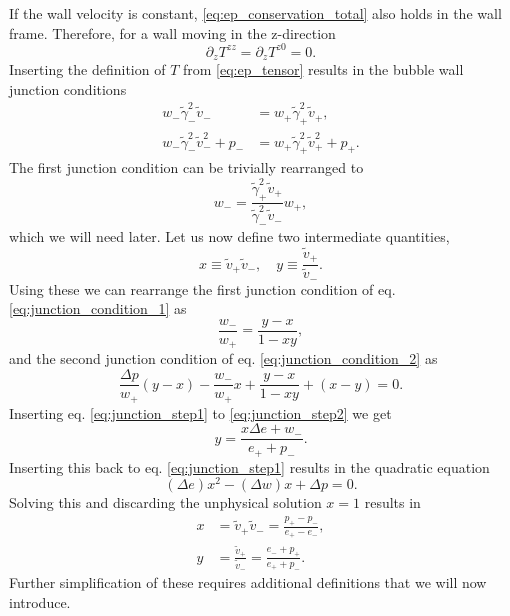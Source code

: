 If the wall velocity is constant, \eqref{eq:ep_conservation_total} also holds in the wall frame.
Therefore, for a wall moving in the z-direction
\cite[eq. 7]{espinosa_energy_2010}
\begin{equation}
\partial_z T^{zz} = \partial_z T^{z0} = 0.
\end{equation}
Inserting the definition of $T$ from \eqref{eq:ep_tensor} results in the
bubble wall junction conditions
\cites[eq. 7.22]{lecture_notes}[eq. 135.2, 135.3]{landau_fluid_1987}
\begin{align}
w_- \tilde{\gamma}_-^2 \tilde{v}_- &= w_+ \tilde{\gamma}_+^2 \tilde{v}_+,
\label{eq:junction_condition_1} \\
w_- \tilde{\gamma}_-^2 \tilde{v}_-^2 + p_- &= w_+ \tilde{\gamma}_+^2 \tilde{v}_+^2 + p_+.
\label{eq:junction_condition_2}
\end{align}
The first junction condition can be trivially rearranged to
\begin{equation}
w_- = \frac{\tilde{\gamma}_+^2 \tilde{v}_+}{\tilde{\gamma}_-^2 \tilde{v}_-} w_+,
\label{eq:wm_junction}
\end{equation}
which we will need later.
Let us now define two intermediate quantities,
\begin{equation}
x \equiv \tilde{v}_+ \tilde{v}_-, \quad y \equiv \frac{\tilde{v}_+}{\tilde{v}_-}.
\end{equation}
Using these we can rearrange the first junction condition of eq. \eqref{eq:junction_condition_1} as
\begin{equation}
\frac{w_-}{w_+} = \frac{y-x}{1-xy},
\label{eq:junction_step1}
\end{equation}
and the second junction condition of eq. \eqref{eq:junction_condition_2} as
\begin{equation}
\frac{\Delta p}{w_+} (y-x) - \frac{w_-}{w_+} x + \frac{y-x}{1-xy} + (x-y) = 0.
\label{eq:junction_step2}
\end{equation}
Inserting eq. \eqref{eq:junction_step1} to \eqref{eq:junction_step2} we get
\begin{equation}
y = \frac{x \Delta e + w_-}{e_+ + p_-}.
\end{equation}
Inserting this back to eq. \eqref{eq:junction_step1} results in the quadratic equation
\begin{equation}
(\Delta e) x^2 - (\Delta w) x + \Delta p = 0.
\end{equation}
Solving this and discarding the unphysical solution $x = 1$ results in
\cites[eq. 7.32]{lecture_notes}[eq. 4.134]{rezzolla_relativistic_2013}
\begin{align}
x &= \tilde{v}_+ \tilde{v}_- = \frac{p_+ - p_-}{e_+ - e_-}, \\
y &= \frac{\tilde{v}_+}{\tilde{v}_-} = \frac{e_- + p_+}{e_+ + p_-}.
\label{eq:junction_ep}
\end{align}
Further simplification of these requires additional definitions
that we will now introduce.


